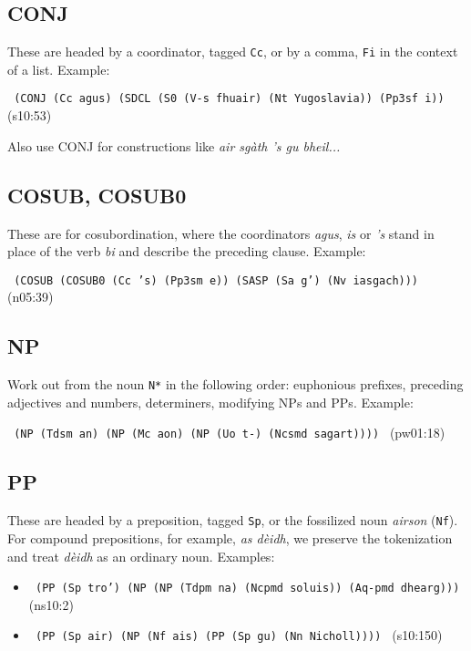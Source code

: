 \documentclass[a4paper]{article}
\begin{document}
\subsection{CONJ}

These are headed by a coordinator, tagged \texttt{Cc}, or by a comma, \texttt{Fi} in the context of a list.
Example:

\texttt{
(CONJ (Cc agus) (SDCL (S0 (V-s fhuair) (Nt Yugoslavia)) (Pp3sf i))
} (s10:53)

Also use CONJ for constructions like \textit{air sg\`ath 's gu bheil...}

\subsection{COSUB, COSUB0}

These are for cosubordination, where the coordinators \textit{agus}, \textit{is} or \textit{'s} stand in place of the verb \textit{bi} and describe the preceding clause.
Example:

\texttt{
(COSUB (COSUB0 (Cc 's) (Pp3sm e)) (SASP (Sa g') (Nv iasgach)))
} (n05:39)

\subsection{NP}

Work out from the noun \texttt{N*} in the following order: euphonious prefixes, preceding adjectives and numbers, determiners, modifying NPs and PPs.
Example: 

\texttt{
(NP (Tdsm an) (NP (Mc aon) (NP (Uo t-) (Ncsmd sagart))))
} (pw01:18)

\subsection{PP}

These are headed by a preposition, tagged \texttt{Sp}, or the fossilized noun \textit{airson} (\texttt{Nf}).
For compound prepositions, for example, \textit{as d\`eidh}, we preserve the tokenization and treat \textit{d\`eidh} as an ordinary noun.
Examples:
\begin{itemize}
\item \texttt{
(PP (Sp tro') (NP (NP (Tdpm na) (Ncpmd soluis)) (Aq-pmd dhearg)))
} (ns10:2)
\item \texttt{
(PP (Sp air) (NP (Nf ais) (PP (Sp gu) (Nn Nicholl))))
} (s10:150)
\end{itemize}
\end{document}
